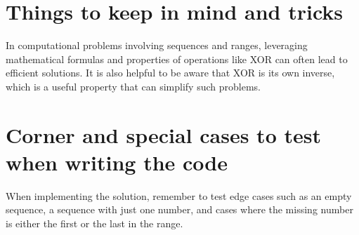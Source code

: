 \section*{Things to keep in mind and tricks}
In computational problems involving sequences and ranges, leveraging mathematical formulas and properties of operations like XOR can often lead to efficient solutions. It is also helpful to be aware that XOR is its own inverse, which is a useful property that can simplify such problems.

\section*{Corner and special cases to test when writing the code}
When implementing the solution, remember to test edge cases such as an empty sequence, a sequence with just one number, and cases where the missing number is either the first or the last in the range.
